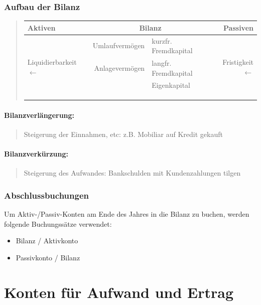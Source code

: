 \subsubsection*{Aufbau der Bilanz}
\begin{verse}
\begin{tabular}{lr|lr}
Aktiven & \multicolumn{2}{c}{Bilanz} & Passiven\tabularnewline
\hline 
\multirow{6}{*}{\begin{sideways}
Liquidierbarkeit $\leftarrow$
\end{sideways}} & Umlaufvermögen & kurzfr. Fremdkapital & \multirow{6}{*}{\begin{sideways}
Fristigkeit$\leftarrow$
\end{sideways}}\tabularnewline
 & Anlagevermögen & langfr. Fremdkapital & \tabularnewline
 &  & Eigenkapital & \tabularnewline
 &  &  & \tabularnewline
 &  &  & \tabularnewline
 &  &  & \tabularnewline
\end{tabular}
\end{verse}

\paragraph*{Bilanzverlängerung:}
\begin{quote}
Steigerung der Einnahmen, etc: z.B. Mobiliar auf Kredit gekauft
\end{quote}

\paragraph*{Bilanzverkürzung:}
\begin{quote}
Steigerung des Aufwandes: Bankschulden mit Kundenzahlungen tilgen
\end{quote}

\subsubsection*{Abschlussbuchungen}

Um Aktiv-/Passiv-Konten am Ende des Jahres in die Bilanz zu buchen,
werden folgende Buchungssätze verwendet:
\begin{itemize}
\item Bilanz / Aktivkonto
\item Passivkonto / Bilanz
\end{itemize}

\section*{Konten für Aufwand und Ertrag}


